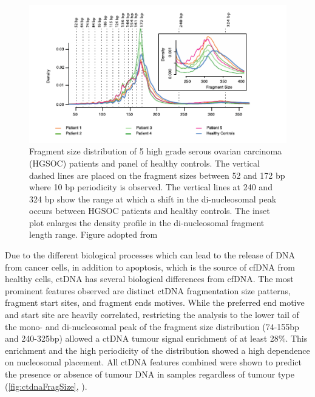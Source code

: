 \begin{figure}[hbt]
\centering
\includegraphics[width=0.9\linewidth]{Figures/intro/fragmentSizeDist}
\caption[Fragment size distribution of ctDNA]{Fragment size distribution of 5 high grade serous
ovarian carcinoma (HGSOC) patients and panel of healthy controls. The vertical dashed lines are placed on the fragment sizes between 52 and 172 bp where 10 bp periodicity is observed. The vertical lines at 240 and 324 bp show the range at which a shift in the di-nucleosomal peak occurs between HGSOC patients and healthy controls. The inset plot enlarges the density profile in the di-nucleosomal fragment length range. Figure adopted from \textcite{Markus2022}}\label{fig:ctdnaFragSize}
\end{figure}

Due to the different biological processes which can lead to the release of DNA from cancer cells, in addition to apoptosis, which is the  source of cfDNA from healthy cells, ctDNA has several biological differences from cfDNA. The most prominent features observed are distinct ctDNA fragmentation size patterns, fragment start sites, and fragment ends motives. While the preferred end motive and start site are heavily correlated, restricting the analysis to the lower tail of the mono- and di-nucleosomal peak of the fragment size distribution (74-155bp and 240-325bp) allowed a ctDNA tumour signal enrichment of at least 28\%. This  enrichment and the high periodicity of the distribution showed a high dependence on nucleosomal placement. All ctDNA features combined were shown  to predict the presence or absence of tumour DNA in samples regardless of tumour type  (\autoref{fig:ctdnaFragSize}, \cite{Mouliere2018,Markus2022}).

 \cite{Posner2022}\cite{Tan2019} \cite{CamposCarrillo2020,PonsBelda2021,Duffy2021}
